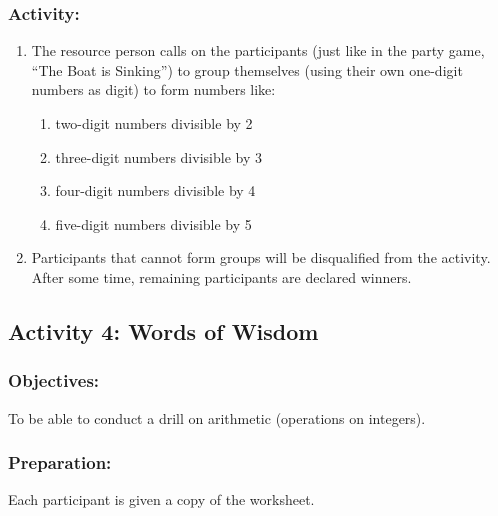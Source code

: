 \subsubsection*{Activity:}
\begin{enumerate}
\item The resource person calls on the participants (just like in the party game, “The Boat is
Sinking”) to group themselves (using their own one-digit numbers as digit) to form numbers
like:
	\begin{enumerate}
	\item two-digit numbers divisible by 2
	\item three-digit numbers divisible by 3
	\item four-digit numbers divisible by 4
	\item five-digit numbers divisible by 5
	\end{enumerate}
\item Participants that cannot form groups will be disqualified from the activity. After some time,
remaining participants are declared winners.
\end{enumerate}
\subsection*{Activity 4: Words of Wisdom}
\subsubsection*{Objectives:}
To be able to conduct a drill on arithmetic (operations on integers).
\subsubsection*{Preparation:}
Each participant is given a copy of the worksheet.
